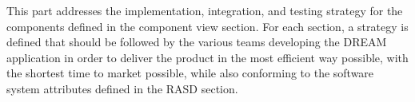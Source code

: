 \documentclass[../../main.tex]{subfiles}
\begin{document}
This part addresses the implementation, integration, and testing strategy for the components defined in the component view section. For each section, a strategy is defined that should be followed by the various teams developing the DREAM application in order to deliver the product in the most efficient way possible, with the shortest time to market possible, while also conforming to the software system attributes defined in the RASD section.
\end{document}
